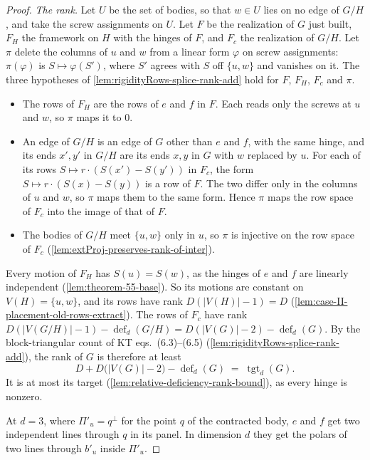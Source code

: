 \begin{proof}
  \emph{The rank.} Let $U$ be the set of bodies, so that $w \in U$ lies
  on no edge of $G/H$, and take the screw assignments on $U$. Let $F$ be
  the realization of $G$ just built, $F_H$ the framework on $H$ with the
  hinges of $F$, and $F_c$ the realization of $G/H$. Let $\pi$ delete
  the columns of $u$ and $w$ from a linear form $\varphi$ on screw
  assignments: $\pi(\varphi)$ is $S \mapsto \varphi(S')$, where $S'$
  agrees with $S$ off $\{u, w\}$ and vanishes on it. The three
  hypotheses of \cref{lem:rigidityRows-splice-rank-add} hold for $F$,
  $F_H$, $F_c$ and $\pi$.
  \begin{itemize}
    \item The rows of $F_H$ are the rows of $e$ and $f$ in $F$. Each
      reads only the screws at $u$ and $w$, so $\pi$ maps it to $0$.
    \item An edge of $G/H$ is an edge of $G$ other than $e$ and $f$, with
      the same hinge, and its ends $x', y'$ in $G/H$ are its ends $x, y$
      in $G$ with $w$ replaced by $u$. For each of its rows
      $S \mapsto r \cdot (S(x') - S(y'))$ in $F_c$, the form
      $S \mapsto r \cdot (S(x) - S(y))$ is a row of $F$. The two differ
      only in the columns of $u$ and $w$, so $\pi$ maps them to the same
      form. Hence $\pi$ maps the row space of $F_c$ into the image of
      that of $F$.
    \item The bodies of $G/H$ meet $\{u, w\}$ only in $u$, so $\pi$ is
      injective on the row space of $F_c$
      (\cref{lem:extProj-preserves-rank-of-inter}).
  \end{itemize}
  Every motion of $F_H$ has $S(u) = S(w)$, as the hinges of $e$ and $f$
  are linearly independent (\cref{lem:theorem-55-base}). So its motions
  are constant on $V(H) = \{u, w\}$, and its rows have rank
  $D(|V(H)| - 1) = D$ (\cref{lem:case-II-placement-old-rows-extract}).
  The rows of $F_c$ have rank
  $D(|V(G/H)| - 1) - \operatorname{def}_d(G/H) =
  D(|V(G)| - 2) - \operatorname{def}_d(G)$. By the block-triangular
  count of KT eqs.~(6.3)--(6.5)
  (\cref{lem:rigidityRows-splice-rank-add}), the rank of $G$ is
  therefore at least
  \[
    D + D\bigl(|V(G)| - 2\bigr) - \operatorname{def}_d(G) \;=\;
    \operatorname{tgt}_d(G).
  \]
  It is at most its target (\cref{lem:relative-deficiency-rank-bound}),
  as every hinge is nonzero.

  At $d = 3$, where $\Pi'_u = q^{\perp}$ for the point $q$ of the
  contracted body, $e$ and $f$ get two independent lines through $q$ in
  its panel. In dimension $d$ they get the polars of two lines through
  $b'_u$ inside $\Pi'_u$.
\end{proof}

